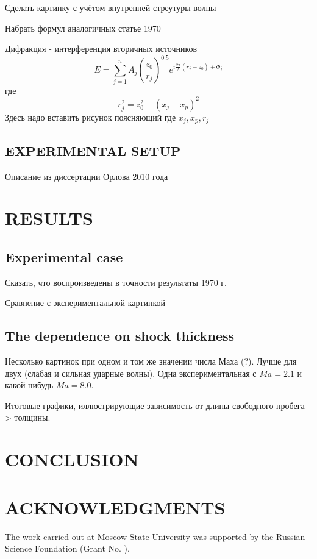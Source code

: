 \documentclass{aip-cp}
\begin{document}
Сделать картинку с учётом внутренней стреутуры волны

Набрать формул аналогичных статье 1970

Дифракция - интерференция вторичных источников
\begin{equation}
E = \sum_{j=1}^{n} A_j \left(\frac{z_0}{r_j} \right)^{0.5} e^{i \frac{2\pi}{\lambda} (r_j - z_0) + \Phi_j}
\end{equation}
где 
\begin{equation}
r_j^2= z_0^2 +( x_j - x_p)^2
\end{equation}
Здесь надо вставить рисунок поясняющий где $x_j, x_p, r_j$ 
\subsection{EXPERIMENTAL SETUP}

Описание из диссертации Орлова 2010 года

\section{RESULTS}
\subsection{Experimental case}

Сказать, что воспроизведены в точности результаты 1970 г. 

Сравнение с экспериментальной картинкой 

\subsection{The dependence on shock thickness}

Несколько картинок при одном и том же значении числа Маха (?). Лучше для двух (слабая и сильная ударные волны). Одна экспериментальная с $Ma=2.1$ и какой-нибудь $Ma=8.0$.

Итоговые графики, иллюстрирующие зависимость от длины свободного пробега --> толщины.

\section{CONCLUSION}

\section{ACKNOWLEDGMENTS}
The work carried out at Moscow State University was supported by the Russian Science Foundation (Grant No. ).


\nocite{*}
%
%
\end{document}
